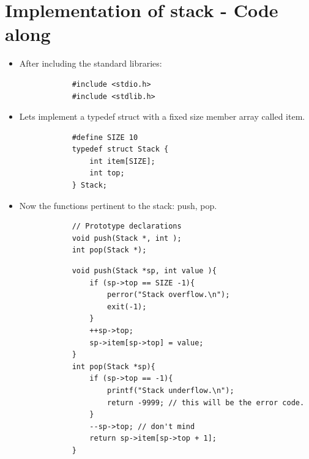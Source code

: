 \section{Implementation of stack - Code along}
\begin{itemize}
    \item After including the standard libraries:
        \begin{verbatim}
            #include <stdio.h>
            #include <stdlib.h>
        \end{verbatim}
    \item Lets implement a typedef struct with a fixed size member array called item.
        \begin{verbatim}
            #define SIZE 10
            typedef struct Stack {
                int item[SIZE];
                int top; 
            } Stack; 
        \end{verbatim}
    
    \item Now the functions pertinent to the stack: push, pop. 
        \begin{verbatim}
            // Prototype declarations
            void push(Stack *, int );
            int pop(Stack *);
        \end{verbatim}
        \begin{verbatim}
            void push(Stack *sp, int value ){
                if (sp->top == SIZE -1){
                    perror("Stack overflow.\n");
                    exit(-1);
                }
                ++sp->top;
                sp->item[sp->top] = value;
            }
            int pop(Stack *sp){
                if (sp->top == -1){
                    printf("Stack underflow.\n");
                    return -9999; // this will be the error code. 
                }
                --sp->top; // don't mind 
                return sp->item[sp->top + 1];
            }
        \end{verbatim}
    

\end{itemize}
